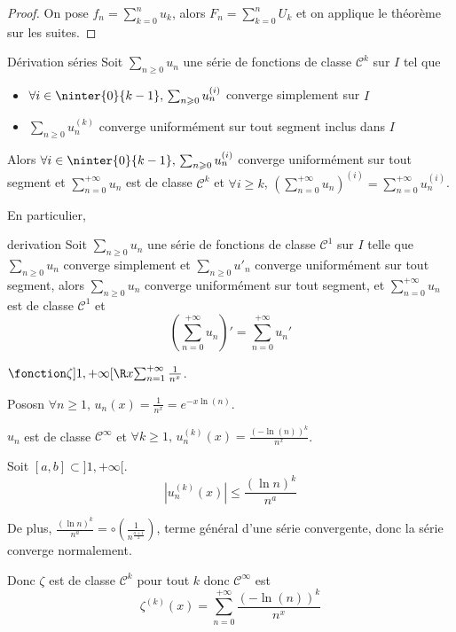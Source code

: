 \begin{proof}
    On pose $\displaystyle f_n = \sum_{k = 0}^n u_k$, alors $\displaystyle F_n = \sum_{k = 0 }^{n } U_k$ et on applique le 
    théorème sur les suites. 
\end{proof}

\begin{theoreme}{Dérivation séries}{}
    Soit $\sum_{n \geqslant 0} u_n$ une série de fonctions de classe $\mathscr{C}^k$ sur $I$ tel que 
    \begin{itemize}
        \item $\forall i \in \ninter{0}{k - 1}, \, \sum_{n \geqslant 0} u_n^{(i)}$ converge simplement sur $I$ 
        \item $\sum_{n \geqslant 0} u_n^{(k)}$ converge uniformément sur tout segment inclus dans $I$   
    \end{itemize}

    Alors $\forall i \in \ninter{0}{k - 1}, \, \sum_{n \geqslant 0} u_n^{(i)}$ converge uniformément sur tout segment
    et $\displaystyle \sum_{n = 0}^{+ \infty} u_n$ est de classe $\mathscr{C}^k$ et 
    $\forall i \geqslant k$, $\displaystyle \left( \sum_{n = 0}^{+ \infty} u_n \right)^{(i)} = \sum_{n = 0}^{+ \infty} u_n^{(i)}$.
\end{theoreme}

En particulier, 

\begin{theoreme}{derivation }{}
    Soit $\sum_{n \geqslant 0} u_n$ une série de fonctions de classe $\mathscr{C}^1$ sur $I$ telle que
    $\sum_{n \geqslant 0} u_n$ converge simplement et $\sum_{n \geqslant 0} u'_n$ converge uniformément sur tout segment, alors 
    $\sum_{n \geqslant 0} u_n$ converge uniformément sur tout segment, et 
    $\displaystyle \sum_{n = 0 }^{+ \infty } u_n$ est de classe $\mathscr C^1$ et 
    $$\left(\sum_{n = 0}^{+ \infty} u_n\right)' = \sum_{n = 0 }^{+ \infty } u_n'$$
\end{theoreme}

\begin{exemple}
    $\fonction \zeta {]1, + \infty[}{\R} x {\sum_{n = 1}^{+ \infty} \frac 1 {n^x}}$.

    Pososn $\forall n \geqslant 1, \, u_n(x) = \frac 1 {n^x} = e^{-x \ln(n)}$.

    $u_n$ est de classe $\mathscr {C}^{\infty}$ et $\forall k \geqslant 1, \, u_n^{(k)}(x) = \frac{(- \ln(n))^k}{n^x}$. 

    Soit $[a, b] \subset ]1, +\infty[$.
    $$\left| u_n^{(k)}(x) \right| \leqslant \frac{(\ln n )^k}{n^a}$$

    De plus, $\displaystyle \frac{(\ln n)^k}{n^a} = \circ \left( \frac 1 {n^{\frac{a + 1}{2}}} \right)$, terme 
    général d'une série convergente, donc la série converge normalement. 

    Donc $\zeta$ est de classe $\mathscr{C}^{k}$ pour tout $k$ donc $\mathscr{C}^{\infty}$ est 
    $$\zeta^{(k)}(x) = \sum_{n = 0}^{+ \infty} \frac{(- \ln(n))^k}{n^x}$$
\end{exemple}

